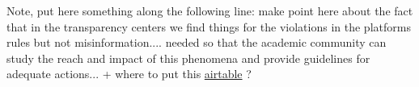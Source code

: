 \documentclass{article}
\begin{document}
{\color{pink} Note, put here something along the following line: make point here about the fact that in the transparency centers we find things for the violations in the platforms rules but not misinformation.... needed so that the academic community can study the reach and impact of this phenomena and provide guidelines for adequate actions... + where to put this \href{https://airtable.com/shrO0ooI9WSEfIUhb/tblAWQwFOiihKdQjm/viwZLAOzLK1NQ0c2n?blocks=hide}{airtable} ? }

\begin{table}[]
\centering
\begin{tabular}{|l|c|l|l|l}


\end{tabular}
\end{table}
\end{document}
